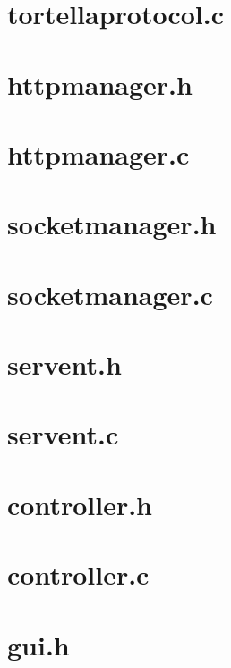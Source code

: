 \section{tortellaprotocol.c}

\pagebreak
\section{httpmanager.h}

\pagebreak
\section{httpmanager.c}

\pagebreak
\section{socketmanager.h}

\pagebreak
\section{socketmanager.c}

\pagebreak
\section{servent.h}

\pagebreak
\section{servent.c}

\pagebreak
\section{controller.h}

\pagebreak
\section{controller.c}

\pagebreak
\section{gui.h}

\pagebreak
